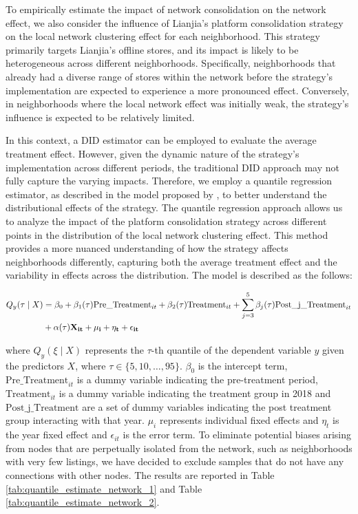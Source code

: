 \documentclass[11pt]{article}
\begin{document}
To empirically estimate the impact of network consolidation on the network effect, we also consider the influence of Lianjia's platform consolidation strategy on the local network clustering effect for each neighborhood. This strategy primarily targets Lianjia's offline stores, and its impact is likely to be heterogeneous across different neighborhoods. Specifically, neighborhoods that already had a diverse range of stores within the network before the strategy's implementation are expected to experience a more pronounced effect. Conversely, in neighborhoods where the local network effect was initially weak, the strategy's influence is expected to be relatively limited. 

In this context, a DID estimator can be employed to evaluate the average treatment effect. However, given the dynamic nature of the strategy's implementation across different periods, the traditional DID approach may not fully capture the varying impacts. Therefore, we employ a quantile regression estimator, as described in the model proposed by \citep{machado_quantiles_2019}, to better understand the distributional effects of the strategy. The quantile regression approach allows us to analyze the impact of the platform consolidation strategy across different points in the distribution of the local network clustering effect. This method provides a more nuanced understanding of how the strategy affects neighborhoods differently, capturing both the average treatment effect and the variability in effects across the distribution. The model is described as the follows:

\begin{equation}
  \begin{aligned}
    Q_y(\tau \mid X) & = \beta_0 + \beta_1(\tau) \text{Pre\_Treatment}_{it} + \beta_2(\tau) \text{Treatment}_{it} + \sum_{j=3}^5 \beta_j(\tau) \text{Post\_j\_Treatment}_{it} \\
                     & + \alpha(\tau) \bf{X}_{it} + \mu_i + \eta_t + \epsilon_{it}
  \end{aligned}
\end{equation}

where $Q_y(\xi \mid X)$ represents the $\tau$-th quantile of the dependent variable $y$ given the predictors $X$, where $\tau \in \{5, 10, \ldots, 95\}$. $\beta_0$ is the intercept term, $\text{Pre\_Treatment}_{it}$ is a dummy variable indicating the pre-treatment period, $\text{Treatment}_{it}$ is a dummy variable indicating the treatment group in 2018 and $\text{Post\_j\_Treatment}$ are a set of dummy variables indicating the post treatment group interacting with that year. $\mu_i$ represents individual fixed effects and $\eta_t$ is the year fixed effect and $\epsilon_{it}$ is the error term. To eliminate potential biases arising from nodes that are perpetually isolated from the network, such as neighborhoods with very few listings, we have decided to exclude samples that do not have any connections with other nodes. The results are reported in Table \ref{tab:quantile_estimate_network_1} and Table \ref{tab:quantile_estimate_network_2}. 
\end{document}
